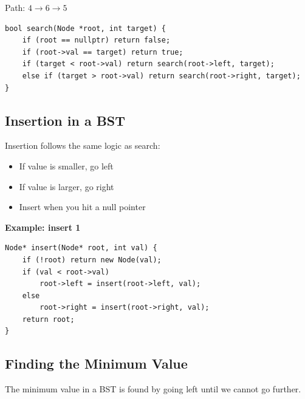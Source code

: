 \documentclass{article}
\begin{document}
Path: $4 \rightarrow 6 \rightarrow 5$

\begin{verbatim}
bool search(Node *root, int target) {
    if (root == nullptr) return false;
    if (root->val == target) return true;
    if (target < root->val) return search(root->left, target);
    else if (target > root->val) return search(root->right, target);
}
\end{verbatim}

\subsection{Insertion in a BST}

Insertion follows the same logic as search:
\begin{itemize}
  \item If value is smaller, go left
  \item If value is larger, go right
  \item Insert when you hit a null pointer
\end{itemize}

\textbf{Example: insert 1}

\begin{center}
\end{center}

\begin{verbatim}
Node* insert(Node* root, int val) {
    if (!root) return new Node(val);
    if (val < root->val)
        root->left = insert(root->left, val);
    else
        root->right = insert(root->right, val);
    return root;
}
\end{verbatim}

\subsection{Finding the Minimum Value}

The minimum value in a BST is found by going left until we cannot go further.

\begin{center}
\end{center}
\end{document}
